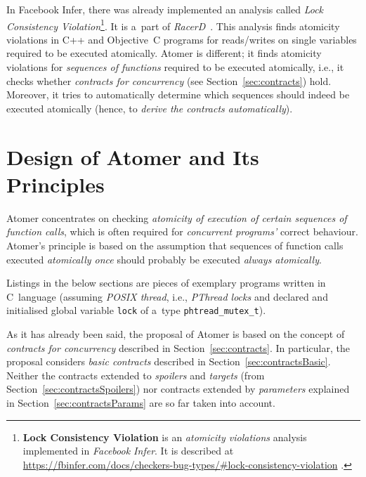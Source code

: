 In Facebook Infer, there was already implemented an analysis called \emph{Lock
Consistency Violation}\footnote{\textbf{Lock Consistency Violation} is an
\emph{atomicity violations} analysis implemented in \emph{Facebook Infer}. It
is described at
\url{https://fbinfer.com/docs/checkers-bug-types/\#lock-consistency-violation}%
.}. It is a~part of \emph{RacerD}~\cite{racerD, staticRaceDetectorTruePositives,
racerDOnline}. This analysis finds atomicity violations in C++ and Objective~C
programs for reads/writes on single variables required to be executed
atomically. Atomer is different; it finds atomicity violations for
\emph{sequences of functions} required to be executed atomically, i.e., it
checks whether \emph{contracts for concurrency}
(see Section~\ref{sec:contracts}) hold. Moreover, it tries to automatically
determine which sequences should indeed be executed atomically (hence, to
\emph{derive the contracts automatically}).


\section{Design of Atomer and Its Principles}
\label{sec:atomerDesing}


Atomer concentrates on checking \emph{atomicity of execution of certain
sequences of function calls}, which is often required for \emph{concurrent
programs'} correct behaviour. Atomer's principle is based on the assumption
that sequences of function calls executed \emph{atomically once}
should probably be executed \emph{always atomically}.

Listings in the below sections are pieces of exemplary programs written
in C~language (assuming \emph{POSIX thread}, i.e., \emph{PThread locks}
and declared and initialised global variable \texttt{lock} of a~type
\texttt{phtread\_mutex\_t}).

As it has already been said, the proposal of Atomer is based on the concept
of \emph{contracts for concurrency} described in Section~\ref{sec:contracts}.
In particular, the proposal considers \emph{basic contracts} described in
Section~\ref{sec:contractsBasic}. Neither the contracts extended to
\emph{spoilers} and \emph{targets} (from Section~\ref{sec:contractsSpoilers})
nor contracts extended by \emph{parameters} explained in
Section~\ref{sec:contractsParams} are so far taken into account.


